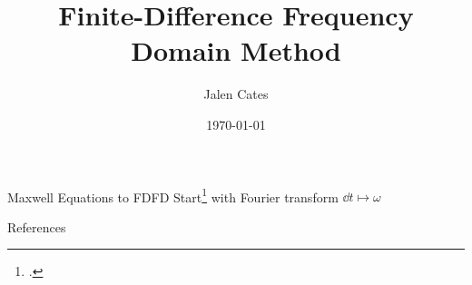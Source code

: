 \documentclass{beamer}
\title[FDFD]{Finite-Difference Frequency Domain Method} %
\author{Jalen Cates} %
\institute[UofA] %
{
University of Arizona\\ %
\medskip
}
\date{\today} %
\begin{document}
\begin{frame}
\titlepage %
\end{frame}


\begin{frame}{Maxwell Equations to FDFD}
Start\footcite{Lang} with Fourier transform $\dd t \mapsto \omega$

\end{frame}



\begin{frame}{References}
    \printbibliography[title={}]
\end{frame}
\end{document}
